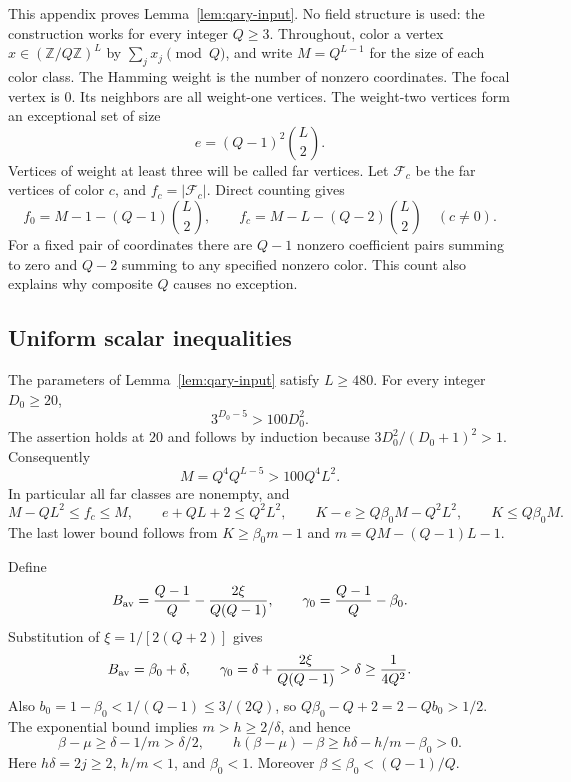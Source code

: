 \documentclass[11pt]{article}
\theoremstyle{definition}
\theoremstyle{remark}
\begin{document}
This appendix proves Lemma~\ref{lem:qary-input}.  No field structure is
used: the construction works for every integer $Q\ge3$.  Throughout,
color a vertex $x\in(\mathbb Z/Q\mathbb Z)^L$ by
$\sum_j x_j\pmod Q$, and write $M=Q^{L-1}$ for the size of each color
class.  The Hamming weight is the number of nonzero coordinates.
The focal vertex is $0$.  Its neighbors are all weight-one vertices.
The weight-two vertices form an exceptional set of size
\[
 e=(Q-1)^2\binom L2.
\]
Vertices of weight at least three will be called far vertices.  Let
$\mathcal F_c$ be the far vertices of color $c$, and $f_c=|\mathcal F_c|$.
Direct counting gives
\begin{equation}
 f_0=M-1-(Q-1)\binom L2,
 \qquad
 f_c=M-L-(Q-2)\binom L2\quad(c\ne0).
 \label{eq:far-counts}
\end{equation}
For a fixed pair of coordinates there are $Q-1$ nonzero coefficient
pairs summing to zero and $Q-2$ summing to any specified nonzero color.
This count also explains why composite $Q$ causes no exception.

\subsection{Uniform scalar inequalities}
\label{app:scalar}

The parameters of Lemma~\ref{lem:qary-input} satisfy $L\ge480$.
For every integer $D_0\ge20$,
\[
 3^{D_0-5}>100D_0^2.
\]
The assertion holds at $20$ and follows by induction because
$3D_0^2/(D_0+1)^2>1$.  Consequently
\begin{equation}
 M=Q^4 Q^{L-5}>100Q^4L^2.
 \label{eq:exponential-margin}
\end{equation}
In particular all far classes are nonempty, and
\begin{equation}
 M-QL^2\le f_c\le M,\qquad
 e+QL+2\le Q^2L^2,\qquad
 K-e\ge Q\beta_0 M-Q^2L^2,\qquad K\le Q\beta_0M.
 \label{eq:elementary-size-bounds}
\end{equation}
The last lower bound follows from $K\ge\beta_0m-1$ and
$m=QM-(Q-1)L-1$.

Define
\[
 B_{\rm av}=\frac{Q-1}{Q}-\frac{2\xi}{Q(Q-1)},\qquad
 \gamma_0=\frac{Q-1}{Q}-\beta_0.
\]
Substitution of $\xi=1/[2(Q+2)]$ gives
\begin{equation}
 B_{\rm av}=\beta_0+\delta,\qquad
 \gamma_0=\delta+\frac{2\xi}{Q(Q-1)}>\delta\ge\frac1{4Q^2}.
 \label{eq:availability-margin}
\end{equation}
Also $b_0=1-\beta_0<1/(Q-1)\le3/(2Q)$, so
$Q\beta_0-Q+2=2-Qb_0>1/2$.
The exponential bound implies
$m>h\ge2/\delta$, and hence
\begin{equation}
 \beta-\mu\ge\delta-1/m>\delta/2,\qquad
 h(\beta-\mu)-\beta
       \ge h\delta-h/m-\beta_0>0.
 \label{eq:off-margin-proof}
\end{equation}
Here $h\delta=2j\ge2$, $h/m<1$, and $\beta_0<1$.
Moreover $\beta\le\beta_0<(Q-1)/Q$.
\end{document}
